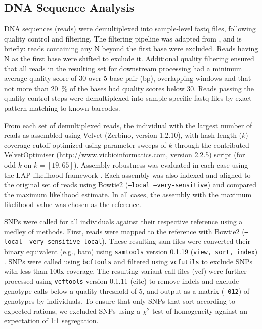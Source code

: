\documentclass[11pt]{article}
\begin{document}
\subsection*{DNA Sequence Analysis}

DNA sequences (reads) were demultiplexed into sample-level fastq files, following quality control 
and filtering.  The filtering pipeline was adapted from \citep{Friedline:2012fm}, and is briefly: reads 
containing any N beyond the first base were excluded. Reads having N as the first base were shifted 
to exclude it.  Additional quality filtering ensured that all reads in the resulting set for downstream 
processing had a minimum average quality score of 30 over 5 base-pair (bp), overlapping windows 
and that not more than \SI{20}{\percent} of the bases had quality scores below 30. Reads passing the 
quality control steps were demultiplexed into sample-specific fastq files by exact pattern matching to 
known barcodes.

From each set of demultiplexed reads, the individual with the largest number of reads as assembled using 
Velvet (Zerbino, version 1.2.10), with hash length ($k$) coverage cutoff optimized using parameter sweeps of $k$ 
through the contributed VelvetOptimiser (\url{http://www.vicbioinformatics.com}, version 2.2.5) 
script (for odd $k$ on $k=[19,65]$).  Assembly robustness was evaluated in each case using the LAP likelihood 
framework \citep{Ghodsi:2013bc}.  Each assembly was also indexed and aligned to the original set of reads 
using Bowtie2 \citep{Langmead:2012jh} (\texttt{--local --very-sensitive}) and compared the maximum 
likelihood estimate. In all cases, the assembly with the maximum likelihood value was chosen as the reference.


SNPs were called for all individuals against their respective reference using a medley of methods.  First, 
reads were mapped to the reference with Bowtie2 (\texttt{--local --very-sensitive-local}).  These resulting 
sam files were converted their binary equivalent (e.g., bam) using \texttt{samtools} version 0.1.19 
(\texttt{view, sort, index}) \citep{Li:2009ka}.  SNPs were called using \texttt{bcftools} and filtered using 
\texttt{vcfutils} to exclude SNPs with less than 100x coverage. The resulting variant call files (vcf) 
were further processed using \texttt{vcftools} version 0.1.11 (cite) to remove indels and exclude genotype 
calls below a quality threshold of 5, and output as a matrix (\texttt{--012}) of genotypes by individuals.  
To ensure that only SNPs that sort according to expected rations, we excluded SNPs using a $\chi^2$ test of 
homogeneity against an expectation of 1:1 segregation.
\end{document}
